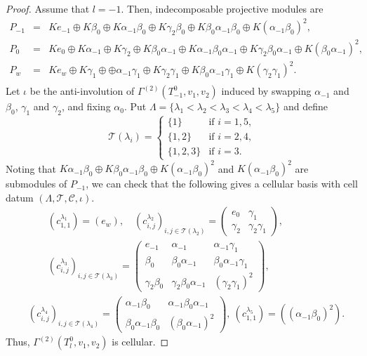 \documentclass[12pt]{amsart}
\numberwithin{equation}{thm}
\newcommand\cC{\mathcal{C}}
\newcommand\cT{\mathcal{T}}
\begin{document}
{\begin{proof}
Assume that $l=-1$. Then, indecomposable projective modules are
\[\begin{array}{lcl}
P_{-1} &=& Ke_{-1}\oplus K \beta_{0}\oplus K\alpha_{-1}\beta_{0}\oplus K\gamma_2\beta_0\oplus K\beta_0\alpha_{-1}\beta_0\oplus K(\alpha_{-1}\beta_0)^2, \\
P_{0} &=& Ke_0\oplus K\alpha_{-1}\oplus K\gamma_{2} \oplus K\beta_0\alpha_{-1}\oplus K\alpha_{-1}\beta_0\alpha_{-1}\oplus K\gamma_2\beta_0\alpha_{-1}\oplus K(\beta_0\alpha_{-1})^2, \\
P_{w} &=& Ke_{w} \oplus K\gamma_{1}\oplus \oplus \alpha_{-1}\gamma_1\oplus K\gamma_2\gamma_1\oplus K\beta_0\alpha_{-1}\gamma_1\oplus K(\gamma_2\gamma_1)^2. \\
\end{array} \]
Let $\iota$ be the anti-involution of $\Gamma^{(2)}(T_{-1}^{0},v_1,v_2)$ induced by 
swapping $\alpha_{-1}$ and $\beta_0$, $\gamma_1$ and $\gamma_2$, and fixing $\alpha_0$. 
Put $\Lambda=\{ \lambda_1<\lambda_2<\lambda_3<\lambda_4<\lambda_5\}$ and define
\[ \cT(\lambda_i)=\left\{\begin{array}{ll}
\{1\} & \text{if $i=1,5$}, \\
\{1,2\} & \text{if $i=2,4$}, \\
\{1,2,3\} & \text{if $i=3$}.\end{array}\right. \]
Noting that $K\alpha_{-1}\beta_0\oplus K\beta_0\alpha_{-1}\beta_0\oplus K(\alpha_{-1}\beta_0)^2$ and $K(\alpha_{-1}\beta_0)^2$ are 
submodules of $P_{-1}$, we can check that the following gives a cellular basis with cell datum $(\Lambda, \cT, \cC, \iota)$.
\begin{align*}
& \qquad (c_{1,1}^{\lambda_1})=(e_w),\quad (c_{i,j}^{\lambda_2})_{i,j\in\cT(\lambda_{2})}=
\begin{pmatrix}
e_0 &  \gamma_1 \\
\gamma_2 & \gamma_2\gamma_1 \end{pmatrix},\\[7pt]
& \qquad (c_{i,j}^{\lambda_3})_{i,j\in\cT(\lambda_{3})}=
\begin{pmatrix}
e_{-1} &  \alpha_{-1} & \alpha_{-1}\gamma_1 \\
\beta_0 & \beta_0\alpha_{-1} & \beta_{0}\alpha_{-1}\gamma_1 \\
\gamma_2\beta_0 & \gamma_2\beta_0\alpha_{-1} & (\gamma_2\gamma_1)^2
 \end{pmatrix},\\[9pt]
& (c_{i,j}^{\lambda_4})_{i,j\in\cT(\lambda_{4})}=
\begin{pmatrix}
\alpha_{-1}\beta_0 &  \alpha_{-1}\beta_0\alpha_{-1} \\
\beta_0\alpha_{-1}\beta_0 & (\beta_{0}\alpha_{-1})^2 \end{pmatrix},\ (c_{1,1}^{\lambda_5})=
((\alpha_{-1}\beta_0)^2).
\end{align*}
Thus, $\Gamma^{(2)}(T_{l}^{0},v_1,v_2)$ is cellular.
\end{proof}

}
\end{document}
